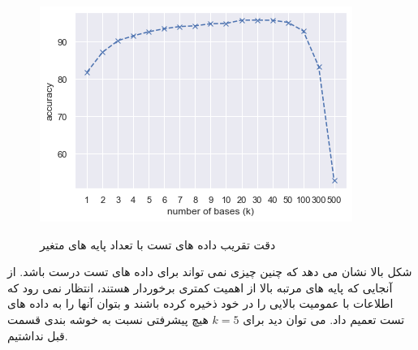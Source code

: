  	\begin{figure}[h]
 		\centering
 		\includegraphics[width=0.8\linewidth]{assets/k_param.png} \\[5pt]
 		\caption{دقت تقریب داده های تست با تعداد پایه های متغیر}
 	\end{figure}
 	شکل بالا نشان می دهد که چنین چیزی نمی تواند برای داده های تست درست باشد. از آنجایی که پایه های مرتبه بالا از اهمیت کمتری برخوردار هستند، انتظار نمی رود که اطلاعات با عمومیت بالایی را در خود ذخیره کرده باشند و بتوان آنها را به داده های تست تعمیم داد. می توان دید برای $ k=5 $ هیچ پیشرفتی نسبت به خوشه بندی قسمت قبل نداشتیم.\\[5pt]
 	 	 	 
